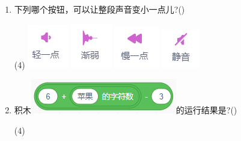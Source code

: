 \documentclass[10pt, a4paper]{article}
\begin{document}
\begin{enumerate}
        \item 下列哪个按钮，可以让整段声音变小一点儿?(\qquad)
        \begin{tasks}(4)
            \task \includegraphics[width=.06\textwidth]{16a.png}
            \task \includegraphics[width=.06\textwidth]{16b.png}
            \task \includegraphics[width=.06\textwidth]{16c.png}
            \task \includegraphics[width=.06\textwidth]{16d.png}
        \end{tasks}

        \item 积木\includegraphics[width=.2\textwidth]{17.png}的运行结果是?(\qquad)
        \begin{tasks}(4)
        \end{tasks}


\end{enumerate}
\end{document}
